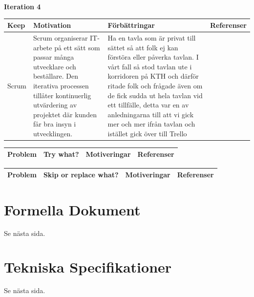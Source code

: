 \documentclass[conference,a4paper]{IEEEtran}
\newcommand\Tstrut{\rule{0pt}{2.6ex}}       %
\newcommand\Bstrut{\rule[-0.9ex]{0pt}{0pt}} %
\newcommand{\TBstrut}{\Tstrut\Bstrut} %
\begin{document}
\textbf{Iteration 4}


\begin{table}[H]
	\small
  \centering
	\begin{tabular}{|p{1.5cm}|p{2cm}|p{1.8cm}|p{1.5cm}|} %
    \hline
    Keep & Motivation & Förbättringar & Referenser \TBstrut \\
    \hline
    Scrum & Scrum organiserar IT-arbete på ett sätt som passar många utvecklare och beställare. Den iterativa processen tillåter kontinuerlig utvärdering av projektet där kunden får bra insyn i utvecklingen. & Ha en tavla som är privat till sättet så att folk ej kan förstöra eller påverka tavlan. I vårt fall så stod tavlan ute i korridoren på KTH och därför ritade folk och frågade även om de fick sudda ut hela tavlan vid ett tillfälle, detta var en av anledningarna till att vi gick mer och mer ifrån tavlan och istället gick över till Trello & \TBstrut \\
    \hline
  \end{tabular}
\end{table}

\begin{table}[H]
	\small
  \centering
	\begin{tabular}{|p{1.5cm}|p{2cm}|p{1.8cm}|p{1.5cm}|} %
    \hline
    Problem & Try what? & Motiveringar & Referenser \TBstrut \\
    \hline
  \end{tabular}
\end{table}

\begin{table}[H]
	\small
  \centering
	\begin{tabular}{|p{1.5cm}|p{2cm}|p{1.8cm}|p{1.5cm}|} %
    \hline
    Problem & Skip or replace what? & Motiveringar & Referenser \TBstrut \\
    \hline
  \end{tabular}
\end{table}

\section{Formella Dokument}
Se nästa sida.
\newpage
\null%
\newpage




\section{Tekniska Specifikationer}
Se nästa sida.
\newpage
\null%
\newpage




\end{document}
